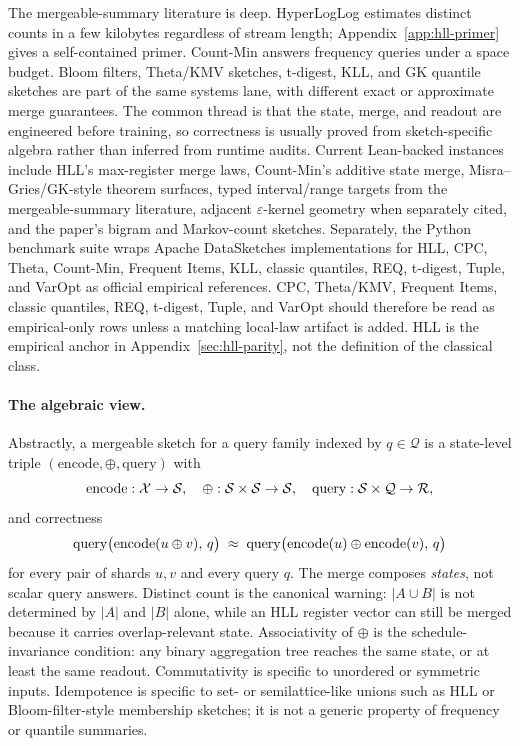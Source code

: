 The mergeable-summary literature is deep. HyperLogLog
\citep{FlajoletEtAl2007,HeuleEtAl2013} estimates distinct counts in a
few kilobytes regardless of stream length; Appendix~\ref{app:hll-primer}
gives a self-contained primer. Count-Min
\citep{CormodeMuthukrishnan2005} answers frequency queries under a
space budget. Bloom filters, Theta/KMV sketches, t-digest, KLL, and GK
quantile sketches are part of the same systems lane, with different
exact or approximate merge guarantees. The common thread is that the
state, merge, and readout are engineered before training, so
correctness is usually proved from sketch-specific algebra rather than
inferred from runtime audits. Current Lean-backed instances include
HLL's max-register merge laws, Count-Min's additive state merge,
Misra--Gries/GK-style theorem surfaces, typed
interval/range targets from the mergeable-summary literature, adjacent
$\varepsilon$-kernel geometry when separately cited, and the paper's bigram
and Markov-count sketches.
Separately, the Python benchmark suite wraps Apache DataSketches
implementations for HLL, CPC, Theta, Count-Min, Frequent Items, KLL,
classic quantiles, REQ, t-digest, Tuple, and VarOpt as official
empirical references. CPC, Theta/KMV, Frequent Items, classic
quantiles, REQ, t-digest, Tuple, and VarOpt should therefore be read
as empirical-only rows unless a matching local-law artifact is added.
HLL is the empirical anchor in Appendix~\ref{sec:hll-parity}, not the
definition of the classical class.

\paragraph{The algebraic view.}
Abstractly, a mergeable sketch for a query family indexed by $q \in
\mathcal{Q}$ is a state-level triple $(\mathrm{encode}, \oplus,
\mathrm{query})$ with
\[
\mathrm{encode} : \mathcal{X} \to \mathcal{S}, \quad
\oplus : \mathcal{S} \times \mathcal{S} \to \mathcal{S}, \quad
\mathrm{query} : \mathcal{S} \times \mathcal{Q} \to \mathcal{R},
\]
and correctness
\[
\mathrm{query}\big(\mathrm{encode}(u \oplus v),\, q\big)
\;\approx\;
\mathrm{query}\big(\mathrm{encode}(u) \oplus \mathrm{encode}(v),\, q\big)
\]
for every pair of shards $u, v$ and every query $q$. The merge
composes \emph{states}, not scalar query answers. Distinct count is
the canonical warning: $|A \cup B|$ is not determined by $|A|$ and
$|B|$ alone, while an HLL register vector can still be merged because
it carries overlap-relevant state. Associativity of $\oplus$ is the
schedule-invariance condition: any binary aggregation tree reaches the
same state, or at least the same readout. Commutativity is specific to
unordered or symmetric inputs. Idempotence is specific to set- or
semilattice-like unions such as HLL or Bloom-filter-style membership
sketches; it is not a generic property of frequency or quantile
summaries.

